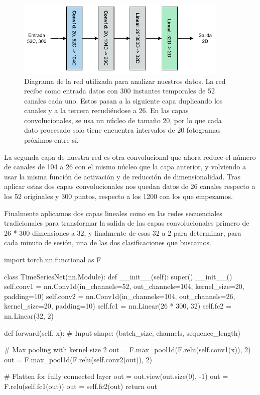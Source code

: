 \begin{figure}[h]
  \centering
  \includegraphics[width=0.9\textwidth]{figures/diagram-conv-lab.pdf}
  \caption{Diagrama de la red utilizada para analizar nuestros datos. La red recibe como entrada datos con 300 instantes temporales de 52 canales cada uno. Estos pasan a la siguiente capa duplicando los canales y a la tercera recudiéndose a 26. En las capas convolucionales, se usa un núcleo de tamaño 20, por lo que cada dato procesado solo tiene encuentra intervalos de 20 fotogramas próximos entre sí.}
  \label{fig:diagram-conv-lab}
\end{figure}

La segunda capa de nuestra red es otra convolucional que ahora reduce el número de canales de 104 a 26 con el mismo núcleo que la capa anterior, y volviendo a usar la misma función de activación y de reducción de dimensionalidad. Tras aplicar estas dos capas convolucionales nos quedan datos de 26 canales respecto a los 52 originales y 300 puntos, respecto a los 1200 con los que empezamos.

Finalmente aplicamos dos capas lineales como en las redes secuenciales tradicionales para transformar la salida de las capas convolucionales primero de 26 * 300 dimensiones a 32, y finalmente de esas 32 a 2 para determinar, para cada minuto de sesión, una de las dos clasificaciones que buscamos.

\begin{mypython}[float={h}, caption=Red convolucional, label={code:convolutional}]
import torch.nn.functional as F

class TimeSeriesNet(nn.Module):
  def __init__(self):
    super().__init__()
    self.conv1 = nn.Conv1d(in_channels=52, out_channels=104,
                           kernel_size=20, padding=10)
    self.conv2 = nn.Conv1d(in_channels=104, out_channels=26,
                           kernel_size=20, padding=10)
    self.fc1 = nn.Linear(26 * 300, 32)
    self.fc2 = nn.Linear(32, 2)

  def forward(self, x):
    # Input shape: (batch_size, channels, sequence_length)

    # Max pooling with kernel size 2
    out = F.max_pool1d(F.relu(self.conv1(x)), 2)  
    out = F.max_pool1d(F.relu(self.conv2(out)), 2)

    # Flatten for fully connected layer
    out = out.view(out.size(0), -1)  
    out = F.relu(self.fc1(out))
    out = self.fc2(out)
    return out
\end{mypython}

